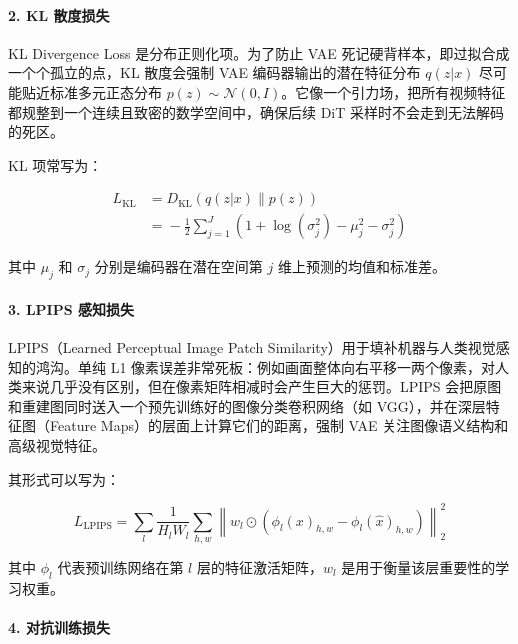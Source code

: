 \hypertarget{kl-ux6563ux5ea6ux635fux5931}{%
\paragraph{2. KL 散度损失}\label{kl-ux6563ux5ea6ux635fux5931}}

KL Divergence Loss 是分布正则化项。为了防止 VAE 死记硬背样本，即过拟合成一个个孤立的点，KL 散度会强制 VAE 编码器输出的潜在特征分布 \(q(z|x)\) 尽可能贴近标准多元正态分布 \(p(z)\sim\mathcal{N}(0,I)\)。它像一个引力场，把所有视频特征都规整到一个连续且致密的数学空间中，确保后续 DiT 采样时不会走到无法解码的死区。

KL 项常写为：

\[
\begin{aligned}
L_{\mathrm{KL}}
&=
D_{\mathrm{KL}}(q(z|x)\|p(z))
\\
&=
{}-\frac{1}{2}\sum_{j=1}^{J}
\left(1+\log(\sigma_j^2)-\mu_j^2-\sigma_j^2\right)
\end{aligned}
\]

其中 \(\mu_j\) 和 \(\sigma_j\) 分别是编码器在潜在空间第 \(j\) 维上预测的均值和标准差。

\hypertarget{lpips-ux611fux77e5ux635fux5931}{%
\paragraph{3. LPIPS 感知损失}\label{lpips-ux611fux77e5ux635fux5931}}

LPIPS（Learned Perceptual Image Patch Similarity）用于填补机器与人类视觉感知的鸿沟。单纯 L1 像素误差非常死板：例如画面整体向右平移一两个像素，对人类来说几乎没有区别，但在像素矩阵相减时会产生巨大的惩罚。LPIPS 会把原图和重建图同时送入一个预先训练好的图像分类卷积网络（如 VGG），并在深层特征图（Feature Maps）的层面上计算它们的距离，强制 VAE 关注图像语义结构和高级视觉特征。

其形式可以写为：

\[
L_{\mathrm{LPIPS}} =
\sum_l
\frac{1}{H_l W_l}
\sum_{h,w}
\left\|
w_l\odot
\left(
\phi_l(x)_{h,w}-\phi_l(\hat{x})_{h,w}
\right)
\right\|_2^2
\]

其中 \(\phi_l\) 代表预训练网络在第 \(l\) 层的特征激活矩阵，\(w_l\) 是用于衡量该层重要性的学习权重。

\hypertarget{ux5bf9ux6297ux8badux7ec3ux635fux5931}{%
\paragraph{4. 对抗训练损失}\label{ux5bf9ux6297ux8badux7ec3ux635fux5931}}

